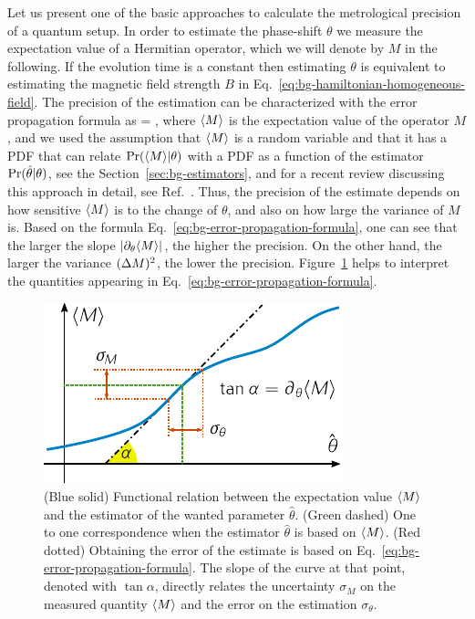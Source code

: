 Let us present one of the basic approaches to calculate the metrological precision of a quantum setup.
In order to estimate the phase-shift $\theta$ we measure the expectation value of a Hermitian operator, which we will denote by $M$ in the following.
If the evolution time is a constant then estimating $\theta$ is equivalent to estimating the magnetic field strength $B$ in Eq.~\eqref{eq:bg-hamiltonian-homogeneous-field}.
The precision of the estimation can be characterized with the error propagation formula as
\be
  \label{eq:bg-error-propagation-formula}
  \varian{\theta} = ,
\ee
where $\langle{M}\rangle$ is the expectation value of the operator $M$, and we used the assumption that $\langle{M}\rangle$ is a random variable and that it has a PDF that can relate $\text{Pr}(\langle{M}\rangle|\theta)$ with a PDF as a function of the estimator $\text{Pr}(\hat{\theta}|\theta)$, see the Section~\ref{sec:bg-estimators}, and for a recent review discussing this approach in detail, see Ref.~\cite{Kolodynski2010}.
Thus, the precision of the estimate depends on how sensitive $\langle{M}\rangle$ is to the change of $\theta$, and also on how large the variance of $M$ is.
Based on the formula Eq.~\eqref{eq:bg-error-propagation-formula}, one can see that the larger the slope $|\partial_\theta \langle{M}\rangle|$, the higher the precision.
On the other hand, the larger the variance $(\Delta M )^2$, the lower the precision.
Figure~\ref{fig:bg-expect-m-evo} helps to interpret the quantities appearing in Eq.~\eqref{eq:bg-error-propagation-formula}.
\begin{figure}[htp]
  \centering
  \includegraphics[scale=1.2]{img/BG_expect_m_evo.pdf}
  \caption[Graphical explanation of the error-propagation formula]{(Blue solid) Functional relation between the expectation value $\langle{M}\rangle$ and the estimator of the wanted parameter $\hat\theta$.
  (Green dashed) One to one correspondence when the estimator $\hat{\theta}$ is based on $\langle{M}\rangle$. (Red dotted) Obtaining the error of the estimate is based on Eq.~\eqref{eq:bg-error-propagation-formula}.
  The slope of the curve at that point, denoted with $\tan\alpha$, directly relates the uncertainty $\sigma_M$ on the measured quantity $\langle{M}\rangle$ and the error on the estimation $\sigma_\theta$.}
  \label{fig:bg-expect-m-evo}
\end{figure}

